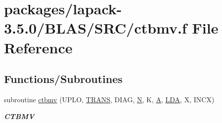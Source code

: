 \hypertarget{lapack-3_85_80_2BLAS_2SRC_2ctbmv_8f}{}\section{packages/lapack-\/3.5.0/\+B\+L\+A\+S/\+S\+R\+C/ctbmv.f File Reference}
\label{lapack-3_85_80_2BLAS_2SRC_2ctbmv_8f}
\subsection*{Functions/\+Subroutines}
\begin{DoxyCompactItemize}
\item 
subroutine \hyperlink{group__complex__blas__level2_ga2483c6533c8a24ff715137629f939074}{ctbmv} (U\+P\+L\+O, \hyperlink{superlu__enum__consts_8h_a0c4e17b2d5cea33f9991ccc6a6678d62a1f61e3015bfe0f0c2c3fda4c5a0cdf58}{T\+R\+A\+N\+S}, D\+I\+A\+G, \hyperlink{polmisc_8c_a0240ac851181b84ac374872dc5434ee4}{N}, K, \hyperlink{classA}{A}, \hyperlink{example__user_8c_ae946da542ce0db94dced19b2ecefd1aa}{L\+D\+A}, X, I\+N\+C\+X)
\begin{DoxyCompactList}\small\item\em {\bfseries C\+T\+B\+M\+V} \end{DoxyCompactList}\end{DoxyCompactItemize}
